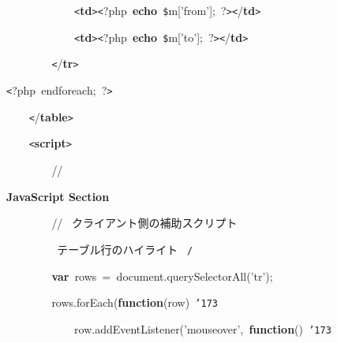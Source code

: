 \documentclass[a4paper,10pt]{article}
\def\mc{\relax}
\begin{document}
\noindent
\mbox{}{\tt\mc \ }{\tt\mc \ }{\tt\mc \ }{\tt\mc \ }{\tt\mc \ }{\tt\mc \ }{\tt\mc \ }{\tt\mc \ }{\tt\mc \ }{\tt\mc \ }{\tt\mc \ }{\tt\mc \ }{\tt <}\textbf{td}{\tt >}{\tt <}?php{\tt\mc \ }\textbf{echo}{\tt\mc \ }{\tt\$}m['from'];{\tt\mc \ }?{\tt >}{\tt <}/\textbf{td}{\tt >}

\noindent
\mbox{}{\tt\mc \ }{\tt\mc \ }{\tt\mc \ }{\tt\mc \ }{\tt\mc \ }{\tt\mc \ }{\tt\mc \ }{\tt\mc \ }{\tt\mc \ }{\tt\mc \ }{\tt\mc \ }{\tt\mc \ }{\tt <}\textbf{td}{\tt >}{\tt <}?php{\tt\mc \ }\textbf{echo}{\tt\mc \ }{\tt\$}m['to'];{\tt\mc \ }?{\tt >}{\tt <}/\textbf{td}{\tt >}

\noindent
\mbox{}{\tt\mc \ }{\tt\mc \ }{\tt\mc \ }{\tt\mc \ }{\tt\mc \ }{\tt\mc \ }{\tt\mc \ }{\tt\mc \ }{\tt <}/\textbf{tr}{\tt >}

\noindent
\mbox{}{\tt <}?php{\tt\mc \ }endforeach;{\tt\mc \ }?{\tt >}

\noindent
\mbox{}{\tt\mc \ }{\tt\mc \ }{\tt\mc \ }{\tt\mc \ }{\tt <}/\textbf{table}{\tt >}

\noindent
\mbox{}\hfill

\noindent
\mbox{}{\tt\mc \ }{\tt\mc \ }{\tt\mc \ }{\tt\mc \ }{\tt <}\textbf{script}{\tt >}

\noindent
\mbox{}{\tt\mc \ }{\tt\mc \ }{\tt\mc \ }{\tt\mc \ }{\tt\mc \ }{\tt\mc \ }{\tt\mc \ }{\tt\mc \ }\rm\mc // \ \centerline{\bf JavaScript Section}
\tt\mc 

\noindent
\mbox{}{\tt\mc \ }{\tt\mc \ }{\tt\mc \ }{\tt\mc \ }{\tt\mc \ }{\tt\mc \ }{\tt\mc \ }{\tt\mc \ }\rm\mc // \ クライアント側の補助スクリプト \hfill
\tt\mc 

\noindent
\mbox{}\hfill

\noindent
\mbox{}{\tt\mc \ }{\tt\mc \ }{\tt\mc \ }{\tt\mc \ }{\tt\mc \ }{\tt\mc \ }{\tt\mc \ }{\tt\mc \ }\rm\mc {\tt /}{\tt *}\  テーブル行のハイライト \rm\mc \ {\tt *}{\tt /}
\tt\mc 

\noindent
\mbox{}{\tt\mc \ }{\tt\mc \ }{\tt\mc \ }{\tt\mc \ }{\tt\mc \ }{\tt\mc \ }{\tt\mc \ }{\tt\mc \ }\textbf{var}{\tt\mc \ }rows{\tt\mc \ }={\tt\mc \ }document.querySelectorAll('tr');

\noindent
\mbox{}{\tt\mc \ }{\tt\mc \ }{\tt\mc \ }{\tt\mc \ }{\tt\mc \ }{\tt\mc \ }{\tt\mc \ }{\tt\mc \ }rows.forEach(\textbf{function}(row){\tt\mc \ }{\tt\char'173}

\noindent
\mbox{}{\tt\mc \ }{\tt\mc \ }{\tt\mc \ }{\tt\mc \ }{\tt\mc \ }{\tt\mc \ }{\tt\mc \ }{\tt\mc \ }{\tt\mc \ }{\tt\mc \ }{\tt\mc \ }{\tt\mc \ }row.addEventListener('mouseover',{\tt\mc \ }\textbf{function}(){\tt\mc \ }{\tt\char'173}
\end{document}
